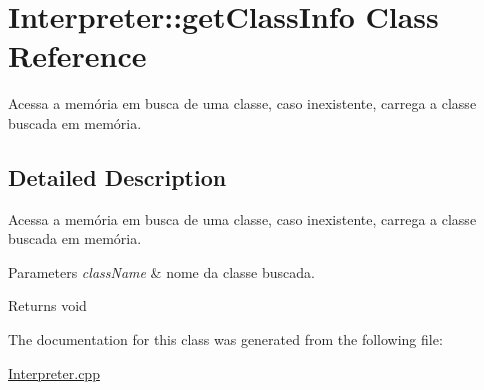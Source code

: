 \hypertarget{class_interpreter_1_1get_class_info}{}\section{Interpreter\+:\+:get\+Class\+Info Class Reference}
\label{class_interpreter_1_1get_class_info}


Acessa a memória em busca de uma classe, caso inexistente, carrega a classe buscada em memória.  




\subsection{Detailed Description}
Acessa a memória em busca de uma classe, caso inexistente, carrega a classe buscada em memória. 


\begin{DoxyParams}{Parameters}
{\em class\+Name} & nome da classe buscada. \\
\hline
\end{DoxyParams}
\begin{DoxyReturn}{Returns}
void 
\end{DoxyReturn}


The documentation for this class was generated from the following file\+:\begin{DoxyCompactItemize}
\item 
\hyperlink{_interpreter_8cpp}{Interpreter.\+cpp}\end{DoxyCompactItemize}
